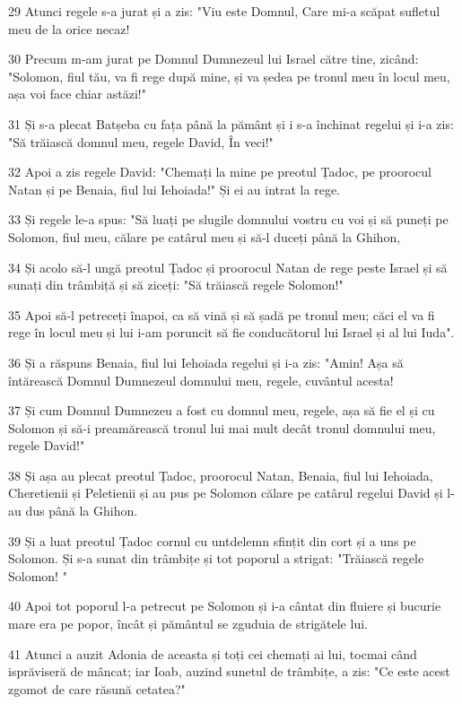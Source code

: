 \par 29 Atunci regele s-a jurat și a zis: "Viu este Domnul, Care mi-a scăpat sufletul meu de la orice necaz!
\par 30 Precum m-am jurat pe Domnul Dumnezeul lui Israel către tine, zicând: "Solomon, fiul tău, va fi rege după mine, și va ședea pe tronul meu în locul meu, așa voi face chiar astăzi!"
\par 31 Și s-a plecat Batșeba cu fața până la pământ și i s-a închinat regelui și i-a zis: "Să trăiască domnul meu, regele David, În veci!"
\par 32 Apoi a zis regele David: "Chemați la mine pe preotul Țadoc, pe proorocul Natan și pe Benaia, fiul lui Iehoiada!" Și ei au intrat la rege.
\par 33 Și regele le-a spus: "Să luați pe slugile domnului vostru cu voi și să puneți pe Solomon, fiul meu, călare pe catârul meu și să-l duceți până la Ghihon,
\par 34 Și acolo să-l ungă preotul Țadoc și proorocul Natan de rege peste Israel și să sunați din trâmbiță și să ziceți: "Să trăiască regele Solomon!"
\par 35 Apoi să-l petreceți înapoi, ca să vină și să șadă pe tronul meu; căci el va fi rege în locul meu și lui i-am poruncit să fie conducătorul lui Israel și al lui Iuda".
\par 36 Și a răspuns Benaia, fiul lui Iehoiada regelui și i-a zis: "Amin! Așa să întărească Domnul Dumnezeul domnului meu, regele, cuvântul acesta!
\par 37 Și cum Domnul Dumnezeu a fost cu domnul meu, regele, așa să fie el și cu Solomon și să-i preamărească tronul lui mai mult decât tronul domnului meu, regele David!"
\par 38 Și așa au plecat preotul Țadoc, proorocul Natan, Benaia, fiul lui Iehoiada, Cheretienii și Peletienii și au pus pe Solomon călare pe catârul regelui David și l-au dus până la Ghihon.
\par 39 Și a luat preotul Țadoc cornul cu untdelemn sfințit din cort și a uns pe Solomon. Și s-a sunat din trâmbițe și tot poporul a strigat: "Trăiască regele Solomon! "
\par 40 Apoi tot poporul l-a petrecut pe Solomon și i-a cântat din fluiere și bucurie mare era pe popor, încât și pământul se zguduia de strigătele lui.
\par 41 Atunci a auzit Adonia de aceasta și toți cei chemați ai lui, tocmai când isprăviseră de mâncat; iar Ioab, auzind sunetul de trâmbițe, a zis: "Ce este acest zgomot de care răsună cetatea?"
